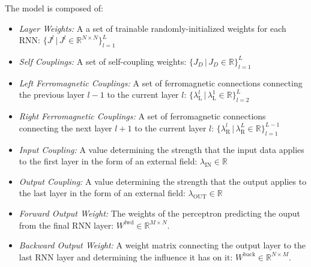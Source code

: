 \documentclass[a4paper,12pt]{report}
\begin{document}
The model is composed of:
\begin{itemize}
    \itemsep-5pt
    \vspace*{-5pt}
    \item \emph{Layer Weights:} A a set of trainable randomly-initialized weights for 
    each RNN:  
    $\{ J^l \hspace{2pt} | \hspace{2pt} J^l \in \mathbb{R}^{N \times N}\}_{l=1}^{L}$
    \item \emph{Self Couplings:} A set of self-coupling weights:
    $\{ J_D \hspace{2pt} | \hspace{2pt} J_D \in \mathbb{R}\}_{l=1}^{L}$
    \item \emph{Left Ferromagnetic Couplings:} A set of ferromagnetic connections 
    connecting the previous layer $l-1$ to the current layer $l$: $ \{ \lambda_{\mathrm{L}}^l 
    \hspace{2pt} | \hspace{2pt} \lambda_{\mathrm{L}}^1 \in \mathbb{R}\}_{l=2}^L$
    \item \emph{Right Ferromagnetic Couplings:} A set of ferromagnetic connections
    connecting the next layer $l+1$ to the current layer $l$: $\{ \lambda_{\mathrm{R}}^l
    \hspace{2pt} | \hspace{2pt} \lambda_{\mathrm{R}}^L \in \mathbb{R}\}_{l=1}^{L-1}$
    \item \emph{Input Coupling:} A value determining the strength that the input data
    applies to the first layer in the form of an external field: $\lambda_{\mathrm{IN}} 
    \in \mathbb{R}$
    \item \emph{Output Coupling:} A value determining the strength that the output
    applies to the last layer in the form of an external field: $\lambda_{\mathrm{OUT}} 
    \in \mathbb{R}$
    \item \emph{Forward Output Weight:}  The weights of the perceptron predicting the 
    ouput from the final RNN layer: $W^{\mathrm{fwd}} \in \mathbb{R}^{M \times N}$.
    \item \emph{Backward Output Weight:} A weight matrix  connecting the output layer to the
    last RNN layer and determining the influence it has on it: $W^{\mathrm{back}} \in \mathbb{R}^{N \times M}$. 
\end{itemize}
\end{document}

